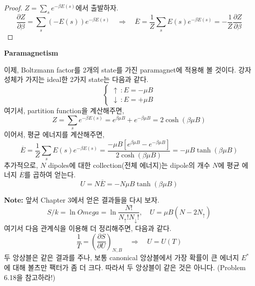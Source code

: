 \documentclass{article}
\begin{document}
\begin{proof}
    $Z = \sum_{s} e^{-\beta E(s)}$에서 출발하자.
    \begin{equation*}
        \frac{\partial Z}{\partial \beta} = \sum_s (-E(s)) e^{-\beta E(s)} \quad \Rightarrow \quad \overline{E} = \frac{1}{Z} \sum_s E(s) e^{-\beta E(s)} = -\frac{1}{Z} \frac{\partial Z}{\partial \beta}
    \end{equation*}
\end{proof}

\noindent
\textbf{Paramagnetism}

이제, Boltzmann factor를 2개의 state를 가진 paramagnet에 적용해 볼 것이다. 강자성체가 가지는 ideal한 2가지 state는 다음과 같다.
\begin{equation*}
    \begin{cases}
        \uparrow \ : E = -\mu B \\
        \downarrow \ : E = + \mu B
    \end{cases}
\end{equation*}
여기서, partition function을 계산해주면,
\begin{equation}
    Z  = \sum_s e^{-\beta E(s)} = e^{\beta \mu B} + e^{-\beta \mu B} = 2\cosh (\beta \mu B)
\end{equation}
이어서, 평균 에너지를 계산해주면,
\begin{equation}
    \overline{E} = \frac{1}{Z} \sum_s E(s) e^{-\beta E(s)} = \frac{-\mu B [e^{\beta \mu B} - e^{-\beta \mu B}]}{2\cosh (\beta \mu B)} = -\mu B \tanh (\beta \mu B)
\end{equation}
추가적으로, $N$ dipoles에 대한 collection(전체 에너지)는 dipole의 개수 $N$에 평균 에너지 $\overline{E}$를 곱하여 얻는다.
\begin{equation}
    U = N\overline{E} = -N \mu B \tanh (\beta \mu B)
\end{equation}

\noindent
\textbf{Note:} 앞서 Chapter 3에서 얻은 결과들을 다시 보자.
\begin{equation}
    S/k = \ln Omega = \ln \frac{N!}{N_\uparrow ! N_\downarrow !}, \quad U = \mu B (N - 2N_\uparrow)
\end{equation}
여기서 다음 관계식을 이용해 더 정리해주면, 다음과 같다.
\begin{equation}
    \frac{1}{T} = \left( \frac{\partial S}{\partial U} \right)_{N, B} \quad \Rightarrow \quad U = U(T)
\end{equation}
두 앙상블은 같은 결과를 주나, 보통 canonical 앙상블에서 가장 확률이 큰 에너지 $E^*$에 대해 볼츠만 팩터가 좀 더 크다. 따라서 두 앙상블이 같은 것은 아니다. (Problem 6.18을 참고하라!)
\end{document}
